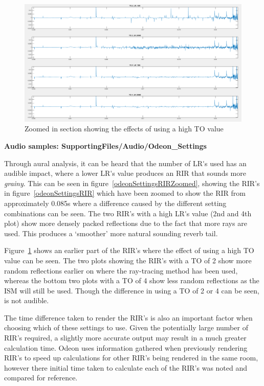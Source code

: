 \documentclass[../../main.tex]{subfiles}
\begin{document}
			\begin{figure}[H]
				\centerline{\includegraphics[scale = 0.3]{Sections/Implementation/Odeon/images/OdeonSettings/settingsFigure_TOZoom.png}}
				\caption{Zoomed in section showing the effects of using a high \ac{TO} value}
				\label{odeonSettings_TOZoomed}
			\end{figure}


				\textbf{Audio samples: SupportingFiles/Audio/Odeon\_Settings}

				Through aural analysis, it can be heard that the number of \ac{LR's} used has an audible impact, where a lower \ac{LR's} value produces an \ac{RIR} that sounds more \textit{grainy}. This can be seen in figure~\ref{odeonSettingsRIRZoomed}, showing the \ac{RIR}'s in figure~\ref{odeonSettingsRIR} which have been zoomed to show the \ac{RIR} from approximately 0.085s where a difference caused by the different setting combinations can be seen. The two \ac{RIR}'s with a high \ac{LR's} value (2nd and 4th plot) show more densely packed reflections due to the fact that more rays are used. This produces a `smoother' more natural sounding reverb tail.

				Figure~\ref{odeonSettings_TOZoomed} shows an earlier part of the \ac{RIR}'s where the effect of using a high \ac{TO} value can be seen. The two plots showing the \ac{RIR}'s with a \ac{TO} of 2 show more random reflections earlier on where the ray-tracing method has been used, whereas the bottom two plots with a \ac{TO} of 4 show less random reflections as the \ac{ISM} will still be used. Though the difference in using a \ac{TO} of 2 or 4 can be seen, is not audible.

				The time difference taken to render the \ac{RIR}'s is also an important factor when choosing which of these settings to use. Given the potentially large number of \ac{RIR}'s required, a slightly more accurate output may result in a much greater calculation time. Odeon uses information gathered when previously rendering \ac{RIR}'s to speed up calculations for other \ac{RIR}'s being rendered in the same room, however there initial time taken to calculate each of the \ac{RIR}'s was noted and compared for reference.
\end{document}
